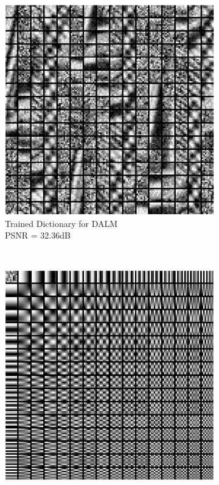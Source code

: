 \documentclass{article} %
\begin{document}
\begin{figure}[h]
        \centering
        \begin{subfigure}[b]{0.5\textwidth}
                \includegraphics[width=\textwidth]{images/Trained_dict_DALM}
                \caption{Trained Dictionary for DALM\\PSNR = 32.36dB}
                \label{fig:DictDALM}
        \end{subfigure}%
        ~ %
        \begin{subfigure}[b]{0.5\textwidth}
                \includegraphics[width=\textwidth]{images/Trained_dict_PALM}

\end{subfigure}
\end{figure}
\end{document}
